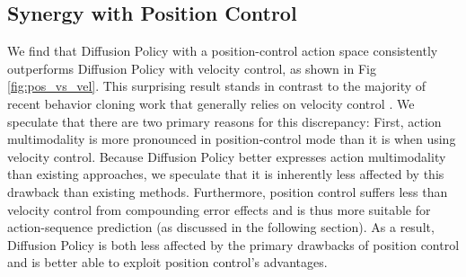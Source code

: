 \documentclass[Afour,sageh,times]{sagej}
\begin{document}
\subsection{Synergy with Position Control} 
\label{sec:property_pos_vs_vel}
We find that Diffusion Policy with a position-control action space consistently outperforms Diffusion Policy with velocity control, as shown in Fig \ref{fig:pos_vs_vel}. This surprising result stands in contrast to the majority of recent behavior cloning work that generally relies on velocity control \cite{robomimic, bet, zhang2018deep, florence2019self, mandlekar2020learning, mandlekar2020iris}. We speculate that there are two primary reasons for this discrepancy: First, action multimodality is more pronounced in position-control mode than it is when using velocity control. Because Diffusion Policy better expresses action multimodality than existing approaches, we speculate that it is inherently less affected by this drawback than existing methods. Furthermore, position control suffers less than velocity control from compounding error effects and is thus more suitable for action-sequence prediction (as discussed in the following section). As a result, Diffusion Policy is both less affected by the primary drawbacks of position control and is better able to exploit position control's advantages.
 


\end{document}
